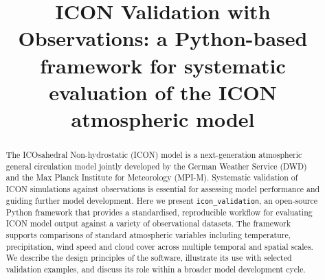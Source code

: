 \documentclass[gmd, manuscript]{copernicus}
\begin{document}
\title{ICON Validation with Observations: a Python-based framework for
  systematic evaluation of the ICON atmospheric model}


\Author[1]{}{[Author 1]}
\Author[1,2]{}{[Author 2]}




\received{}
\pubdiscuss{}
\revised{}
\accepted{}
\published{}


\maketitle

\begin{abstract}
The ICOsahedral Non-hydrostatic (ICON) model is a next-generation
atmospheric general circulation model jointly developed by the German
Weather Service (DWD) and the Max Planck Institute for Meteorology (MPI-M).
Systematic validation of ICON simulations against observations is essential
for assessing model performance and guiding further model development.
Here we present \texttt{icon\_validation}, an open-source Python framework
that provides a standardised, reproducible workflow for evaluating ICON
model output against a variety of observational datasets.
The framework supports comparisons of standard atmospheric variables
including temperature, precipitation, wind speed and cloud cover across
multiple temporal and spatial scales.
We describe the design principles of the software, illustrate its use with
selected validation examples, and discuss its role within a broader model
development cycle.
\end{abstract}

\introduction
\end{document}
